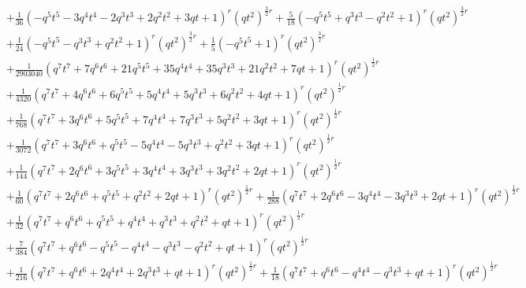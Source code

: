 \documentclass[11pt,english]{amsart}
\numberwithin{equation}{section}
\numberwithin{figure}{section}
\theoremstyle{plain}
\theoremstyle{plain}
\theoremstyle{definition}
\theoremstyle{remark}
\begin{document}
{\begin{align*}
& + \frac{1}{36}  {\left(-q^{5} t^{5} - 3  q^{4} t^{4} - 2  q^{3} t^{3} + 2  q^{2} t^{2} + 3  q t + 1\right)}^{r} \left(q t^{2}\right)^{\frac{3}{2}  r} + \frac{5}{18}  {\left(-q^{5} t^{5} + q^{3} t^{3} - q^{2} t^{2} + 1\right)}^{r} \left(q t^{2}\right)^{\frac{3}{2}  r} \\
& + \frac{1}{24}  {\left(-q^{5} t^{5} - q^{3} t^{3} + q^{2} t^{2} + 1\right)}^{r} \left(q t^{2}\right)^{\frac{3}{2}  r} + \frac{1}{5}  {\left(-q^{5} t^{5} + 1\right)}^{r} \left(q t^{2}\right)^{\frac{3}{2}  r} \\
& + \frac{1}{2903040}  {\left(q^{7} t^{7} + 7  q^{6} t^{6} + 21  q^{5} t^{5} + 35  q^{4} t^{4} + 35  q^{3} t^{3} + 21  q^{2} t^{2} + 7  q t + 1\right)}^{r} \left(q t^{2}\right)^{\frac{1}{2}  r} \\
& + \frac{1}{4320}  {\left(q^{7} t^{7} + 4  q^{6} t^{6} + 6  q^{5} t^{5} + 5  q^{4} t^{4} + 5  q^{3} t^{3} + 6  q^{2} t^{2} + 4  q t + 1\right)}^{r} \left(q t^{2}\right)^{\frac{1}{2}  r} \\
& + \frac{1}{768}  {\left(q^{7} t^{7} + 3  q^{6} t^{6} + 5  q^{5} t^{5} + 7  q^{4} t^{4} + 7  q^{3} t^{3} + 5  q^{2} t^{2} + 3  q t + 1\right)}^{r} \left(q t^{2}\right)^{\frac{1}{2}  r} \\
& + \frac{1}{3072}  {\left(q^{7} t^{7} + 3  q^{6} t^{6} + q^{5} t^{5} - 5  q^{4} t^{4} - 5  q^{3} t^{3} + q^{2} t^{2} + 3  q t + 1\right)}^{r} \left(q t^{2}\right)^{\frac{1}{2}  r} \\
& + \frac{1}{144}  {\left(q^{7} t^{7} + 2  q^{6} t^{6} + 3  q^{5} t^{5} + 3  q^{4} t^{4} + 3  q^{3} t^{3} + 3  q^{2} t^{2} + 2  q t + 1\right)}^{r} \left(q t^{2}\right)^{\frac{1}{2}  r} \\
& + \frac{1}{60}  {\left(q^{7} t^{7} + 2  q^{6} t^{6} + q^{5} t^{5} + q^{2} t^{2} + 2  q t + 1\right)}^{r} \left(q t^{2}\right)^{\frac{1}{2}  r} + \frac{1}{288}  {\left(q^{7} t^{7} + 2  q^{6} t^{6} - 3  q^{4} t^{4} - 3  q^{3} t^{3} + 2  q t + 1\right)}^{r} \left(q t^{2}\right)^{\frac{1}{2}  r} \\
& + \frac{1}{32}  {\left(q^{7} t^{7} + q^{6} t^{6} + q^{5} t^{5} + q^{4} t^{4} + q^{3} t^{3} + q^{2} t^{2} + q t + 1\right)}^{r} \left(q t^{2}\right)^{\frac{1}{2}  r} \\
& + \frac{7}{384}  {\left(q^{7} t^{7} + q^{6} t^{6} - q^{5} t^{5} - q^{4} t^{4} - q^{3} t^{3} - q^{2} t^{2} + q t + 1\right)}^{r} \left(q t^{2}\right)^{\frac{1}{2}  r} \\
& + \frac{1}{216}  {\left(q^{7} t^{7} + q^{6} t^{6} + 2  q^{4} t^{4} + 2  q^{3} t^{3} + q t + 1\right)}^{r} \left(q t^{2}\right)^{\frac{1}{2}  r} + \frac{1}{18}  {\left(q^{7} t^{7} + q^{6} t^{6} - q^{4} t^{4} - q^{3} t^{3} + q t + 1\right)}^{r} \left(q t^{2}\right)^{\frac{1}{2}  r} \\

\end{align*}}
\end{document}

